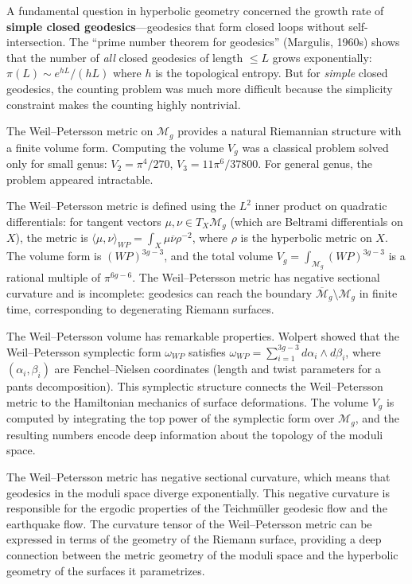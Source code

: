 A fundamental question in hyperbolic geometry concerned the growth rate of \textbf{simple closed geodesics}---geodesics that form closed loops without self-intersection. The ``prime number theorem for geodesics'' (Margulis, 1960s) shows that the number of \emph{all} closed geodesics of length $\le L$ grows exponentially: $\pi(L) \sim e^{hL}/(hL)$ where $h$ is the topological entropy. But for \emph{simple} closed geodesics, the counting problem was much more difficult because the simplicity constraint makes the counting highly nontrivial.

The Weil--Petersson metric on $\mathcal{M}_g$ provides a natural Riemannian structure with a finite volume form. Computing the volume $V_g$ was a classical problem solved only for small genus: $V_2 = \pi^4/270$, $V_3 = 11\pi^6/37800$. For general genus, the problem appeared intractable.

The Weil--Petersson metric is defined using the $L^2$ inner product on quadratic differentials: for tangent vectors $\mu, \nu \in T_X \mathcal{M}_g$ (which are Beltrami differentials on $X$), the metric is $\langle \mu, \nu \rangle_{WP} = \int_X \mu \overline{\nu} \rho^{-2}$, where $\rho$ is the hyperbolic metric on $X$. The volume form is $(WP)^{3g-3}$, and the total volume $V_g = \int_{\mathcal{M}_g} (WP)^{3g-3}$ is a rational multiple of $\pi^{6g-6}$. The Weil--Petersson metric has negative sectional curvature and is incomplete: geodesics can reach the boundary $\overline{\mathcal{M}}_g \setminus \mathcal{M}_g$ in finite time, corresponding to degenerating Riemann surfaces.

The Weil--Petersson volume has remarkable properties. Wolpert showed that the Weil--Petersson symplectic form $\omega_{WP}$ satisfies $\omega_{WP} = \sum_{i=1}^{3g-3} d\alpha_i \wedge d\beta_i$, where $(\alpha_i, \beta_i)$ are Fenchel--Nielsen coordinates (length and twist parameters for a pants decomposition). This symplectic structure connects the Weil--Petersson metric to the Hamiltonian mechanics of surface deformations. The volume $V_g$ is computed by integrating the top power of the symplectic form over $\mathcal{M}_g$, and the resulting numbers encode deep information about the topology of the moduli space.

The Weil--Petersson metric has negative sectional curvature, which means that geodesics in the moduli space diverge exponentially. This negative curvature is responsible for the ergodic properties of the Teichm\"uller geodesic flow and the earthquake flow. The curvature tensor of the Weil--Petersson metric can be expressed in terms of the geometry of the Riemann surface, providing a deep connection between the metric geometry of the moduli space and the hyperbolic geometry of the surfaces it parametrizes.

